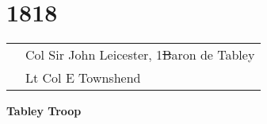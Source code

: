 \chapter*{1818}

\vspace*{10mm}

\begin{center}
  \begin{tabular}{rl}
    & Col Sir John Leicester, 1\st Baron de Tabley \\
    & Lt Col E Townshend \\
  \end{tabular}
\end{center}

\vspace*{10mm}

\begin{center}
  \Large
  \textbf{Tabley Troop}
\end{center}


